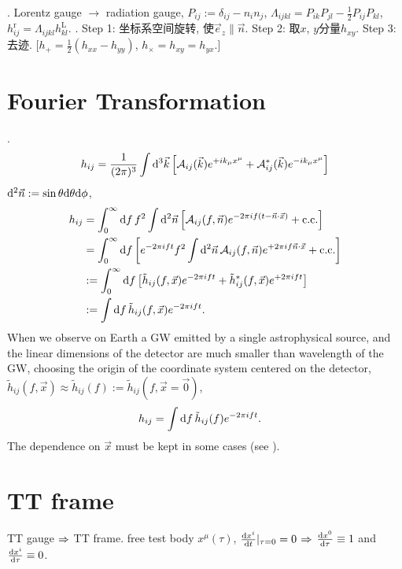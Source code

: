 \cite{Maggiore2014}. Lorentz gauge $\to$ radiation gauge, $P_{ij}:=\delta_{ij}-n_in_j$, $\Lambda_{ijkl}=P_{ik}P_{jl}-\frac{1}{2}P_{ij}P_{kl}$, $h_{ij}^\text{r}=\Lambda_{ijkl}h_{kl}^\text{L}$. \cite{Sathyaprakash2009}. Step 1: 坐标系空间旋转, 使$\vec{e}_z\parallel\vec{n}$. Step 2: 取$x$, $y$分量$h_{xy}$. Step 3: 去迹. [$h_+=\frac{1}{2}(h_{xx}-h_{yy})$, $h_\times=h_{xy}=h_{yx}$.]

\section{Fourier Transformation}

\def\A{\mathcal{A}}
\cite{Maggiore2014}. 
\begin{equation}
    h_{ij}=\frac{1}{(2\pi)^3}\int\d^3\vec{k}\left[\A_{ij}(\vec{k})e^{+ik_\mu x^\mu}+\A_{ij}^*(\vec{k})e^{-ik_\mu x^\mu}\right]
\end{equation}
$\mathrm{d}^2\vec{n}:=\sin\theta\mathrm{d}\theta\mathrm{d}\phi$,
\begin{align}
    h_{ij}&=\int_0^\infty\d f\, f^2\int\d^2\vec{n}\left[\A_{ij}(f,\vec{n})e^{-2\pi i f(t-\vec{n}\cdot\vec{x})}+\text{c.c.}\right]\\
    &=\int_0^\infty\d f\left[e^{-2\pi i ft}f^2\int\d^2\vec{n}\,\A_{ij}(f,\vec{n})e^{+2\pi i f\vec{n}\cdot\vec{x}}+\text{c.c.}\right]\\
    &:=\int_0^\infty\d f\left[\tilde{h}_{ij}(f,\vec{x})e^{-2\pi i ft}+\tilde{h}_{ij}^*(f,\vec{x})e^{+2\pi i ft}\right]\\
    &:=\int\d f\,\tilde{h}_{ij}(f,\vec{x})e^{-2\pi i ft}.
\end{align}
When we observe on Earth a GW emitted by a single astrophysical source, and the linear dimensions of the detector are much smaller than wavelength of the GW, choosing the origin of the coordinate system centered on the detector, $\tilde{h}_{ij}(f,\vec{x})\approx\tilde{h}_{ij}(f):=\tilde{h}_{ij}(f,\vec{x}=\vec{0})$,
\begin{align}
    h_{ij}&=\int\mathrm{d} f\,\tilde{h}_{ij}(f)e^{-2\pi i ft}.
\end{align}
The dependence on $\vec{x}$ must be kept in some cases (see \cite{Maggiore2014}).

\section{TT frame}

TT gauge $\Rightarrow$ TT frame. free test body $x^\mu(\tau)$, $\frac{\mathrm{d} x^i}{\mathrm{d} t}|_{\tau=0}=0$ $\Rightarrow$ $\frac{\mathrm{d} x^0}{\mathrm{d} \tau}\equiv1$ and $\frac{\mathrm{d} x^i}{\mathrm{d} \tau}\equiv0$.

